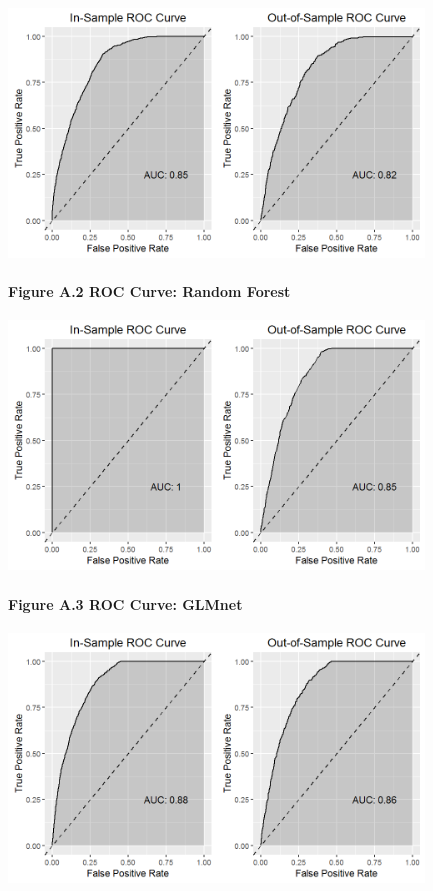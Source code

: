 \documentclass[]{article}
\let\oldparagraph\paragraph
\renewcommand{\paragraph}[1]{\oldparagraph{#1}\mbox{}}
\begin{document}
\includegraphics[height=2.60417in]{images/resp_m1_nb_sample_roc.png}

\paragraph{Figure A.2 ROC Curve: Random
Forest}\label{figure-a.2-roc-curve-random-forest}

\includegraphics[height=2.60417in]{images/resp_m2_rf_sample_roc.png}

\paragraph{Figure A.3 ROC Curve:
GLMnet}\label{figure-a.3-roc-curve-glmnet}

\includegraphics[height=2.60417in]{images/resp_m3_glm_sample_roc.png}
\end{document}

